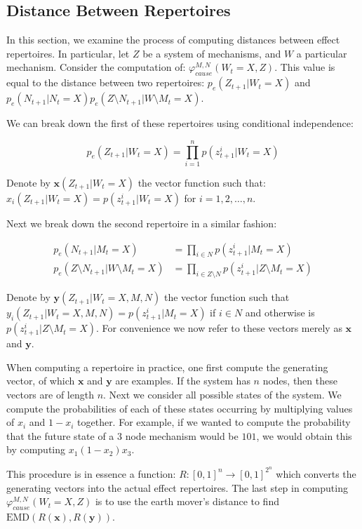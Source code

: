 \subsection{Distance Between Repertoires}
In this section, we examine the process of computing distances between effect repertoires. In particular, let $Z$ be a system of mechanisms, and $W$ a particular mechanism. Consider the computation of: $\varphi^{M,N}_{cause}(W_t = X, Z)$. This value is equal to the distance between two repertoires: $p_e(Z_{t+1}|W_t = X)$ and $p_e(N_{t+1}|N_t = X)p_e(Z\setminus N_{t+1}|W \setminus M _t = X)$.

We can break down the first of these repertoires using conditional independence:

\begin{equation}
\label{eq:dist_argument_1}
p_e(Z_{t+1}|W_t = X)=\prod \limits_{i=1}^{n} p(z^i_{t+1}|W_t=X)
\end{equation}

Denote by $\mathbf{x}(Z_{t+1}|W_t = X)$ the vector function such that:
$x_i(Z_{t+1}|W_t = X) = p(z^i_{t+1}|W_t=X)$ for $i = 1, 2, \ldots, n$.

Next we break down the second repertoire in a similar fashion:

\begin{align}
\label{eq:dist_argument_2}
p_e(N_{t+1}|M_t = X)&=\prod \limits_{i\in N} p(z^i_{t+1}|M_t=X)\\
p_e(Z\setminus N_{t+1}|W \setminus M_t = X)&=\prod \limits_{i\in Z \setminus N} p(z^i_{t+1}|Z \setminus M_t=X)
\end{align}

Denote by $\mathbf{y}(Z_{t+1}|W_t = X, M,N)$ the vector function such that $y_i(Z_{t+1}|W_t = X, M,N) = p(z^i_{t+1}|M_t=X)$ if $i \in N$ and otherwise is $p(z^i_{t+1}|Z \setminus M_t=X)$. For convenience we now refer to these vectors merely as $\mathbf{x}$ and $\mathbf{y}$.

When computing a repertoire in practice, one first compute the generating vector, of which $\mathbf{x}$ and $\mathbf{y}$ are examples. If the system has $n$ nodes, then these vectors are of length $n$. Next we consider all possible states of the system. We compute the probabilities of each of these states occurring by multiplying values of $x_i$ and $1-x_i$ together. For example, if we wanted to compute the probability that the future state of a 3 node mechanism would be $101$, we would obtain this by computing $x_1 (1-x_2)x_3$.

This procedure is in essence a function: $R: [0,1]^n \rightarrow [0,1]^{2^n}$ which converts the generating vectors into the actual effect repertoires. The last step in computing  $\varphi^{M,N}_{cause}(W_t = X, Z)$ is to use the earth mover's distance to find $\text{EMD}(R(\mathbf{x}), R(\mathbf{y}))$.

